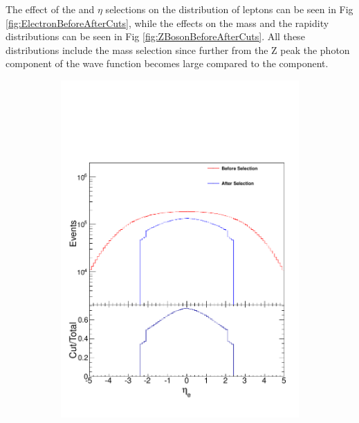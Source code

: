 The effect of the \pt and $\eta$ selections on the distribution of leptons can be seen in Fig \ref{fig:ElectronBeforeAfterCuts}, while the effects on the \Z mass and the \Z rapidity distributions can be seen in Fig \ref{fig:ZBosonBeforeAfterCuts}. All these distributions include the mass selection since further from the Z peak the photon component of the wave function becomes large compared to the \Z component.   

  \begin{figure}[!p]
    \centering
    \begin{subfigure}[b]{\SideBySidePlotWidth}
        \includegraphics[width=\linewidth]{figures/DataAnaStrat/AllElectEtaMCCompPlot.pdf}
        \caption{}
    \end{subfigure}%
    \begin{subfigure}[b]{\SideBySidePlotWidth}

\end{subfigure}
\end{figure}
